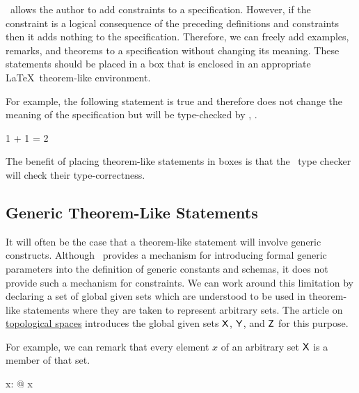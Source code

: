 \documentclass{amsart}
\begin{document}
\ZN\ allows the author to add constraints to a specification.
However, if the constraint is a logical consequence of the preceding definitions and constraints
then it adds nothing to the specification.
Therefore, we can freely add examples, remarks, and theorems to a specification without changing its meaning.
These statements should be placed in a  box that is enclosed in an appropriate \LaTeX\ theorem-like environment.

For example, the following statement is true and therefore does not change the meaning of
the specification but will be type-checked by \fuzz, .

\begin{example}

\begin{zed}
	1 + 1 = 2
\end{zed}
	
\end{example}

The benefit of placing theorem-like statements in  boxes is that the \fuzz\ type checker will check their type-correctness.

\subsection{Generic Theorem-Like Statements}

It will often be the case that a theorem-like statement will involve generic constructs.
Although \ZN\ provides a mechanism for introducing formal generic parameters into the definition of
generic constants and schemas, it does not provide such a mechanism for constraints.
We can work around this limitation by declaring a set of global given sets which are understood to be used in theorem-like
statements where they are taken to represent arbitrary sets.
The article on \href{../../math/mathz-topological-spaces/mathz-topological-spaces.pdf}{topological spaces} 
introduces the global given sets $\mathsf{X}$, $\mathsf{Y}$, and $\mathsf{Z}$ for this purpose.

For example, we can remark that every element $x$ of an arbitrary set $\mathsf{X}$ is a member of that set.

\begin{remark}

\begin{zed}
	\forall x: \setX @ x \in \setX
\end{zed}

\end{remark}
\end{document}
